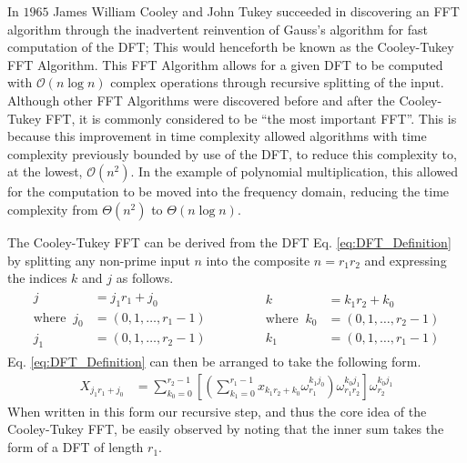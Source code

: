 In $1965$ James William Cooley and John Tukey succeeded in discovering an FFT algorithm through the inadvertent reinvention of Gauss's algorithm for fast computation of the DFT; This would henceforth be known as the Cooley-Tukey FFT Algorithm.\cite{Cooley1965}\cite{Heideman1985}
This FFT Algorithm allows for a given DFT to be computed with $\mathcal{O}\left(n\log n\right)$ complex operations through recursive splitting of the input.\cite{Cooley1965}
Although other FFT Algorithms were discovered before and after the Cooley-Tukey FFT, it is commonly considered to be ``the most important FFT''\cite{Frigo2005}.
This is because this improvement in time complexity allowed algorithms with 
time complexity previously bounded by use of the DFT, to reduce this complexity 
to, at the lowest, $\mathcal{O}\left(n^2\right)$.
In the example of polynomial multiplication, this allowed for the computation
to be moved into the frequency domain, reducing the time complexity from 
$\Theta\left(n^2\right)$ to $\Theta\left(n\log n\right)$.\cite{IntroToAlgos}


The Cooley-Tukey FFT can be derived from the DFT Eq. \ref{eq:DFT_Definition} by splitting any non-prime input $n$ into the composite $n=r_1r_2$ and expressing the indices $k$ and $j$ as follows.
\begin{align}\label{eq:IndexManipulation}
    \begin{aligned}
        j&=j_1r_1+j_0 \\
        \text{where }~
        j_0&=(0,1,\dots,r_1-1) \\
        j_1&=(0,1,\dots,r_2-1) 
    \end{aligned}
    \begin{aligned}
        &~&~&~
    \end{aligned}
    \begin{aligned}
        k&=k_1r_2+k_0 \\
        \text{where }~k_0&=(0,1,\dots,r_2-1) \\
        k_1&=(0,1,\dots,r_1-1)
    \end{aligned}
\end{align}
Eq. \ref{eq:DFT_Definition} can then be arranged to take the following form.
\begin{align}
    X_{j_1r_1+j_0}&=\sum^{r_2-1}_{k_0=0}\left[\left(\sum^{r_1-1}_{k_1=0}x_{k_1r_2+k_0}\omega_{r_1}^{k_1j_0}\right)\omega_{r_1r_2}^{k_0j_1}\right]\omega_{r_2}^{k_0j_1}
    \label{eq:FFTDefinitionFromDFT}
\end{align}
When written in this form our recursive step, and thus the core idea of the Cooley-Tukey FFT, be easily observed by noting that the inner sum takes the form of a DFT of length $r_1$.


